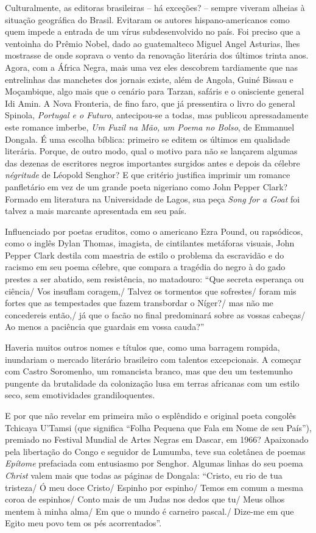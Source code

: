 \documentclass[
  letterpaper,
  DIV=11,
  numbers=noendperiod]{scrreprt}
\begin{document}
Culturalmente, as editoras brasileiras -- há exceções? -- sempre viveram
alheias à situação geográfica do Brasil. Evitaram os autores
hispano-americanos como quem impede a entrada de um vírus
subdesenvolvido no país. Foi preciso que a ventoinha do Prêmio Nobel,
dado ao guatemalteco Miguel Angel Asturias, lhes mostrasse de onde
soprava o vento da renovação literária dos últimos trinta anos. Agora,
com a África Negra, mais uma vez eles descobrem tardiamente que nas
entrelinhas das manchetes dos jornais existe, além de Angola, Guiné
Bissau e Moçambique, algo mais que o cenário para Tarzan, safáris e o
onisciente general Idi Amin. A Nova Fronteria, de fino faro, que já
pressentira o livro do general Spinola, \emph{Portugal e o Futuro},
antecipou-se a todas, mas publicou apressadamente este romance imberbe,
\emph{Um Fuzil na Mão, um Poema no Bolso}, de Emmanuel Dongala. É uma
escolha bíblica: primeiro se editem os últimos em qualidade literária.
Porque, de outro modo, qual o motivo para não se lançarem algumas das
dezenas de escritores negros importantes surgidos antes e depois da
célebre \emph{négritude} de Léopold Senghor? E que critério justifica
imprimir um romance panfletário em vez de um grande poeta nigeriano como
John Pepper Clark? Formado em literatura na Universidade de Lagos, sua
peça \emph{Song for a Goat} foi talvez a mais marcante apresentada em
seu país.

Influenciado por poetas eruditos, como o americano Ezra Pound, ou
rapsódicos, como o inglês Dylan Thomas, imagista, de cintilantes
metáforas visuais, John Pepper Clark destila com maestria de estilo o
problema da escravidão e do racismo em seu poema célebre, que compara a
tragédia do negro à do gado prestes a ser abatido, sem resistência, no
matadouro: ``Que secreta esperança ou ciência/ Vos insuflam coragem,/
Talvez os tormentos que sofrestes/ foram mis fortes que as tempestades
que fazem transbordar o Níger?/ mas não me concedereis então,/ já que o
facão no final predominará sobre as vossas cabeças/ Ao menos a paciência
que guardais em vossa cauda?''

Haveria muitos outros nomes e títulos que, como uma barragem rompida,
inundariam o mercado literário brasileiro com talentos excepcionais. A
começar com Castro Soromenho, um romancista branco, mas que deu um
testemunho pungente da brutalidade da colonização lusa em terras
africanas com um estilo seco, sem emotividades grandiloquentes.

E por que não revelar em primeira mão o esplêndido e original poeta
congolês Tchicaya U'Tamsi (que significa ``Folha Pequena que Fala em
Nome de seu País''), premiado no Festival Mundial de Artes Negras em
Dascar, em 1966? Apaixonado pela libertação do Congo e seguidor de
Lumumba, teve sua coletânea de poemas \emph{Epítome} prefaciada com
entusiasmo por Senghor. Algumas linhas do seu poema \emph{Christ} valem
mais que todas as páginas de Dongala: ``Cristo, eu rio de tua tristeza/
Ó meu doce Cristo/ Espinho por espinho/ Temos em comum a mesma coroa de
espinhos/ Conto mais de um Judas nos dedos que tu/ Meus olhos mentem à
minha alma/ Em que o mundo é carneiro pascal./ Dize-me em que Egito meu
povo tem os pés acorrentados''.
\end{document}
